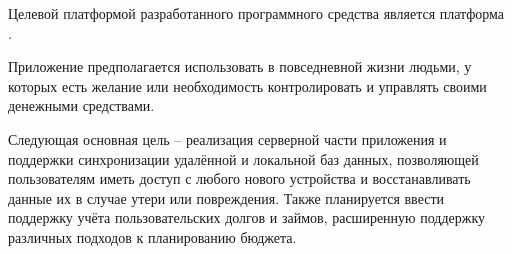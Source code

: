 Целевой платформой разработанного программного средства является платформа \andro.

Приложение предполагается использовать в повседневной жизни людьми, у которых есть желание или необходимость контролировать и управлять своими денежными средствами.

Следующая основная цель -- реализация серверной части приложения и поддержки синхронизации удалённой и локальной баз данных, позволяющей пользователям иметь доступ с любого нового устройства и восстанавливать данные их в случае утери или повреждения.
Также планируется ввести поддержку учёта пользовательских долгов и займов, расширенную поддержку различных подходов к планированию бюджета.

